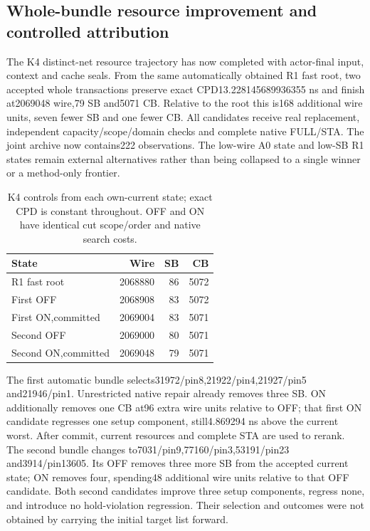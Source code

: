 \subsection{Whole-bundle resource improvement and controlled attribution}
The K4 distinct-net resource trajectory has now completed with actor-final input, context and cache seals. From the same automatically obtained R1 fast root, two accepted whole transactions preserve exact CPD13.228145689936355 ns and finish at2069048 wire,79 SB and5071 CB. Relative to the root this is168 additional wire units, seven fewer SB and one fewer CB. All candidates receive real replacement, independent capacity/scope/domain checks and complete native FULL/STA. The joint archive now contains222 observations. The low-wire A0 state and low-SB R1 states remain external alternatives rather than being collapsed to a single winner or a method-only frontier.

\begin{table}[t]
\centering\scriptsize
\caption{K4 controls from each own-current state; exact CPD is constant throughout. OFF and ON have identical cut scope/order and native search costs.}
\begin{tabular}{lrrr}
\hline
State & Wire & SB & CB\\
\hline
R1 fast root &2068880&86&5072\\
First OFF &2068908&83&5072\\
First ON,committed &2069004&83&5071\\
Second OFF &2069000&80&5071\\
Second ON,committed &2069048&79&5071\\
\hline
\end{tabular}
\end{table}
The first automatic bundle selects31972/pin8,21922/pin4,21927/pin5 and21946/pin1. Unrestricted native repair already removes three SB. ON additionally removes one CB at96 extra wire units relative to OFF; that first ON candidate regresses one setup component, still4.869294 ns above the current worst. After commit, current resources and complete STA are used to rerank. The second bundle changes to7031/pin9,77160/pin3,53191/pin23 and3914/pin13605. Its OFF removes three more SB from the accepted current state; ON removes four, spending48 additional wire units relative to that OFF candidate. Both second candidates improve three setup components, regress none, and introduce no hold-violation regression. Their selection and outcomes were not obtained by carrying the initial target list forward.

